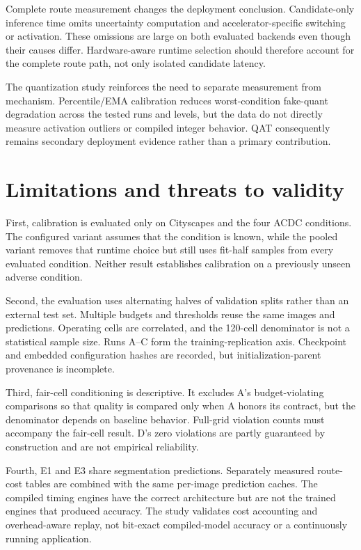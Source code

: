 \documentclass[a4paper,review,12pt]{elsarticle}
\begin{document}
Complete route measurement changes the deployment conclusion. Candidate-only inference time omits uncertainty computation and accelerator-specific switching or activation. These omissions are large on both evaluated backends even though their causes differ. Hardware-aware runtime selection should therefore account for the complete route path, not only isolated candidate latency.

The quantization study reinforces the need to separate measurement from mechanism. Percentile/EMA calibration reduces worst-condition fake-quant degradation across the tested runs and levels, but the data do not directly measure activation outliers or compiled integer behavior. QAT consequently remains secondary deployment evidence rather than a primary contribution.

\section{Limitations and threats to validity}
\label{sec:limitations}

First, calibration is evaluated only on Cityscapes and the four ACDC conditions. The configured variant assumes that the condition is known, while the pooled variant removes that runtime choice but still uses fit-half samples from every evaluated condition. Neither result establishes calibration on a previously unseen adverse condition.

Second, the evaluation uses alternating halves of validation splits rather than an external test set. Multiple budgets and thresholds reuse the same images and predictions. Operating cells are correlated, and the 120-cell denominator is not a statistical sample size. Runs A--C form the training-replication axis. Checkpoint and embedded configuration hashes are recorded, but initialization-parent provenance is incomplete.

Third, fair-cell conditioning is descriptive. It excludes A's budget-violating comparisons so that quality is compared only when A honors its contract, but the denominator depends on baseline behavior. Full-grid violation counts must accompany the fair-cell result. D's zero violations are partly guaranteed by construction and are not empirical reliability.

Fourth, E1 and E3 share segmentation predictions. Separately measured route-cost tables are combined with the same per-image prediction caches. The compiled timing engines have the correct architecture but are not the trained engines that produced accuracy. The study validates cost accounting and overhead-aware replay, not bit-exact compiled-model accuracy or a continuously running application.
\end{document}
